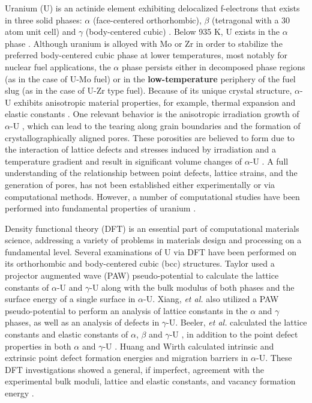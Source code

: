 \documentclass[utf8]{frontiersSCNS} %
\providecommand{\DIFaddtex}[1]{{\bf #1}} %
\providecommand{\DIFdeltex}[1]{} %
\providecommand{\DIFaddbegin}{\protect\color{blue}} %
\providecommand{\DIFaddend}{\protect\color{black}} %
\providecommand{\DIFdelbegin}{\protect\color{red}} %
\providecommand{\DIFdelend}{\protect\color{black}} %
\providecommand{\DIFadd}[1]{\texorpdfstring{\DIFaddtex{#1}}{#1}} %
\providecommand{\DIFdel}[1]{\texorpdfstring{\DIFdeltex{#1}}{}} %
\begin{document}
Uranium (U) is an actinide element exhibiting delocalized f-electrons that exists in three solid phases: $\alpha$ (face-centered orthorhombic), $\beta$ (tetragonal with a 30 atom unit cell) and $\gamma$ (body-centered cubic) \cite{yoo1998}. Below 935 K, U exists in the $\alpha$ phase \cite{soderlind1998}. Although uranium is alloyed with Mo or Zr in order to stabilize the preferred body-centered cubic phase at lower temperatures, most notably for nuclear fuel applications, the $\alpha$ phase persists either in decomposed phase regions (as in the case of U-Mo fuel) \DIFdelbegin \DIFdel{, }\DIFdelend or in the \DIFdelbegin \DIFdel{low temperature }\DIFdelend \DIFaddbegin \DIFadd{low-temperature }\DIFaddend periphery of the fuel slug (as in the case of U-Zr type fuel). Because of its unique crystal structure, $\alpha$-U exhibits anisotropic material properties, for example, thermal expansion \cite{lloyd1966} and elastic constants \cite{fisher1958}. One relevant behavior is the anisotropic irradiation growth of $\alpha$-U \cite{leggett1963}, which can lead to the tearing along grain boundaries and the formation of crystallographically aligned pores. These porosities are believed to form due to the interaction of lattice defects and stresses induced by irradiation and a temperature gradient \DIFdelbegin \DIFdel{, }\DIFdelend and result in significant volume changes of $\alpha$-U \cite{leggett1963,paine1958}. A full understanding of the relationship between point defects, lattice strains, and the generation of pores, has not been established either experimentally or via computational methods. However, a number of computational studies have been performed into fundamental properties of uranium \cite{jokisaari2020}. 

Density functional theory (DFT) is an essential part of computational materials science, addressing a variety of problems in materials design and processing on a fundamental level. Several examinations of U via DFT have been performed on its orthorhombic and body-centered cubic (bcc) structures. Taylor \cite{taylor2008} used a projector augmented wave (PAW) pseudo-potential to calculate the lattice constants of $\alpha$-U and $\gamma$-U along with the bulk modulus of both phases and the surface energy of a single surface in $\alpha$-U. Xiang, \textit{et al.} \cite{xiang2008} also utilized a PAW pseudo-potential to perform an analysis of lattice constants in the $\alpha$ and $\gamma$ phases, as well as an analysis of defects in $\gamma$-U. Beeler, \textit{et al.} calculated the lattice constants and elastic constants of $\alpha$, $\beta$ and $\gamma$-U \cite{beeler2013}, in addition to the point defect properties in both $\alpha$ and $\gamma$-U \cite{beeler2010}. Huang and Wirth \cite{wirth2011, wirth2012} calculated intrinsic and extrinsic point defect formation energies and migration barriers in $\alpha$-U. These DFT investigations showed a general, if imperfect, agreement with the experimental bulk moduli, lattice and elastic constants, and vacancy formation energy \cite{yoo1998, barrett1963, matter1980}. 
\end{document}
